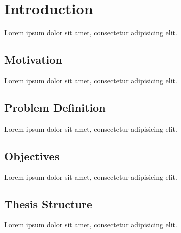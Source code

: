 \chapter{Introduction} %
\label{cha:introduction}

Lorem ipsum dolor sit amet, consectetur adipisicing elit.

\section{Motivation} %
\label{sec:introduction:motivation}

Lorem ipsum dolor sit amet, consectetur adipisicing elit.


\section{Problem Definition} %
\label{sec:introduction:problem_definition}

Lorem ipsum dolor sit amet, consectetur adipisicing elit.


\section{Objectives} %
\label{sec:introduction:objectives}

Lorem ipsum dolor sit amet, consectetur adipisicing elit.


\section{Thesis Structure} %
\label{sec:introduction:thesis_structure}

Lorem ipsum dolor sit amet, consectetur adipisicing elit.


